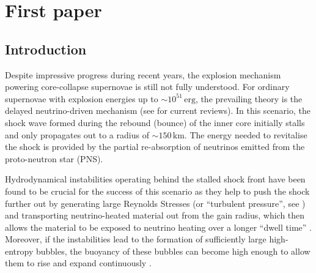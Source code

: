 \chapter{First paper}
\section{Introduction}
Despite impressive progress during recent years, the explosion
mechanism powering core-collapse supernovae is still not fully
understood. For ordinary supernovae with explosion energies up to
$\mathord{\sim}10^{51} \,\mathrm{erg}$, the prevailing theory is the
delayed neutrino-driven mechanism (see
\citealp{janka_12,burrows_13} for current reviews). In this scenario,
the shock wave formed during the rebound (bounce) of the inner core
initially stalls and only propagates out to a radius of
$\mathord{\sim}150 \,\mathrm{km}$. The energy needed to revitalise the
shock is provided by the partial re-absorption of neutrinos emitted
from the proto-neutron star (PNS).  

Hydrodynamical instabilities operating behind the stalled shock front
have been found to be crucial for the success of this scenario as they
help to push the shock further out by generating large Reynolds
Stresses (or ``turbulent pressure'', see \citealp{burrows_95,murphy_12,couch_15,mueller_15a})
and transporting neutrino-heated material out from the gain radius, which then
allows the material to be exposed to neutrino heating over a longer
``dwell time'' \citep{buras_06b,murphy_08b}. Moreover, if the
instabilities lead to the formation of sufficiently large high-entropy
bubbles, the buoyancy of these bubbles can become high enough to
allow them to rise and expand continuously
\citep{thompson_00,dolence_13,fernandez_15}. 

